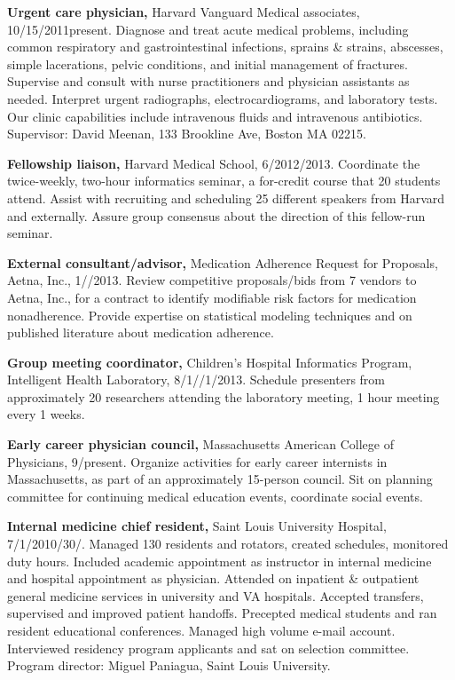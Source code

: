 \documentclass[12pt]{article}
\begin{document}
\textbf{Urgent care physician,} Harvard Vanguard Medical associates,
10/15/2011\ndash{}present. Diagnose and treat acute medical problems,
including common respiratory and gastrointestinal infections, sprains
\& strains, abscesses, simple lacerations, pelvic conditions, and
initial management of fractures. Supervise and consult with nurse
practitioners and physician assistants as needed. Interpret urgent
radiographs, electrocardiograms, and laboratory tests. Our clinic
capabilities include intravenous fluids and intravenous antibiotics.
Supervisor: David Meenan, 133 Brookline Ave, Boston MA 02215.

\textbf{Fellowship liaison,} Harvard Medical School,
6/2012/2013. Coordinate the twice-week\-ly, two-hour
informatics seminar, a for-credit course that 20 students attend.
Assist with recruiting and scheduling 25 different speakers from
Harvard and externally. Assure group consensus about the direction of
this fellow-run seminar.

\textbf{External consultant/advisor,} Medication Adherence Request for
Proposals, Aetna, Inc.,
1/\ndash{}/2013. Review competitive
proposals/bids from 7 vendors to Aetna, Inc., for a contract to
identify modifiable risk factors for medication nonadherence. Provide
expertise on statistical modeling techniques and on published
literature about medication adherence.

\textbf{Group meeting coordinator,} Children’s Hospital Informatics
Program, Intel\-li\-gent Health Lab\-o\-ra\-to\-ry,
8/1/\ndash{}/1/2013. Schedule
presenters from approximately 20 researchers attending the laboratory
meeting, 1 hour meeting every 1 weeks.

\textbf{Early career physician council,} Massachusetts American
College of Physicians,
9/\ndash{}\linebreak[0]pres\-ent. Organize activities
for early career internists in Massachusetts, as part of an
approximately 15-person council. Sit on planning committee for
continuing medical education events, coordinate social events.

\textbf{Internal medicine chief resident,} Saint Louis University
Hospital, 7/1/2010\ndash{}/30/. Managed
130 residents and rotators, created schedules, monitored duty hours.
Included academic appointment as instructor in internal medicine and
hospital appointment as physician. Attended on inpatient \& outpatient
general medicine services in university and VA hospitals. Accepted
transfers, supervised and improved patient handoffs. Precepted medical
students and ran resident educational conferences. Managed high volume
e-mail account. Interviewed residency program applicants and sat on
selection committee. Program director: Miguel Paniagua, Saint Louis
University.
\end{document}
